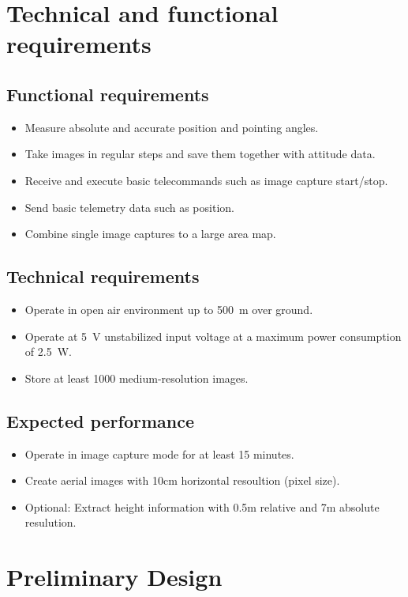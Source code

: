 \documentclass[fontsize=11pt,paper=a4,]{scrartcl}
\begin{document}
\section{Technical and functional requirements}
\subsection{Functional requirements}
\label{sub:Functional_requirements}
\begin{itemize}
\item Measure absolute and accurate position and pointing angles.
\item Take images in regular steps and save them together with attitude data.
\item Receive and execute basic telecommands such as image capture start/stop.
\item Send basic telemetry data such as position.
\item Combine single image captures to a large area map.
\end{itemize}


\subsection{Technical requirements}
\begin{itemize}
\item Operate in open air environment up to 500~m over ground.
\item Operate at 5~V unstabilized input voltage at a maximum power consumption of 2.5~W.
\item Store at least 1000 medium-resolution images.
\end{itemize}


\subsection{Expected performance}
\begin{itemize}
\item Operate in image capture mode for at least 15 minutes.
\item Create aerial images with 10cm horizontal resoultion (pixel size).
\item Optional: Extract height information with 0.5m relative and 7m absolute resulution.
\end{itemize}

\section{Preliminary Design}
\end{document}

